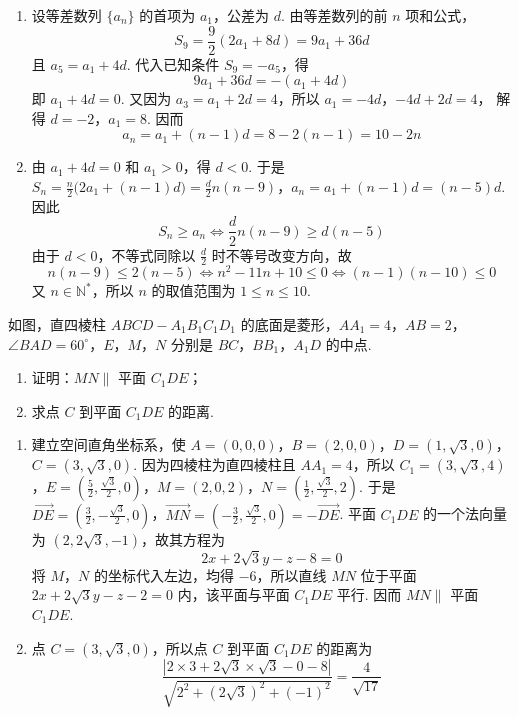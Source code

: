 \begin{solution}
\begin{enumerate}
\item 设等差数列 \(\{a_n\}\) 的首项为 \(a_1\)，公差为 \(d\). 由等差数列的前 \(n\) 项和公式，
\[
S_9=\frac{9}{2}(2a_1+8d)=9a_1+36d
\]
且 \(a_5=a_1+4d\). 代入已知条件 \(S_9=-a_5\)，得
\[
9a_1+36d=-(a_1+4d)
\]
即 \(a_1+4d=0\). 又因为 \(a_3=a_1+2d=4\)，所以
\(a_1=-4d\)，\(-4d+2d=4\)，
解得 \(d=-2\)，\(a_1=8\). 因而
\[
a_n=a_1+(n-1)d=8-2(n-1)=10-2n
\]

\item 由 \(a_1+4d=0\) 和 \(a_1>0\)，得 \(d<0\). 于是
\(S_n=\frac{n}{2}\bigl(2a_1+(n-1)d\bigr)=\frac{d}{2}n(n-9)\)，\(a_n=a_1+(n-1)d=(n-5)d\).
因此
\[
S_n\ge a_n
\iff \frac{d}{2}n(n-9)\ge d(n-5)
\]
由于 \(d<0\)，不等式同除以 \(\frac{d}{2}\) 时不等号改变方向，故
\[
n(n-9)\le2(n-5)
\iff n^2-11n+10\le0
\iff (n-1)(n-10)\le0
\]
又 \(n\in\mathbb N^*\)，所以 \(n\) 的取值范围为 \(1\le n\le10\).
\end{enumerate}
\end{solution}

\begin{problem}
如图，直四棱柱 \( ABCD-A_1B_1C_1D_1 \) 的底面是菱形，\( AA_1=4 \)，\( AB=2 \)，\( \angle BAD=60^\circ \)，\(E\)，\(M\)，\(N\) 分别是 \(BC\)，\(BB_1\)，\(A_1D\) 的中点.

\begin{enumerate}
\item 证明：\( MN\parallel \) 平面 \(C_1DE\)；
\item 求点 \(C\) 到平面 \(C_1DE\) 的距离.
\end{enumerate}

\end{problem}

\begin{solution}
\begin{enumerate}
\item 建立空间直角坐标系，使
\(A=(0,0,0)\)，\(B=(2,0,0)\)，\(D=(1,\sqrt3,0)\)，\(C=(3,\sqrt3,0)\).
因为四棱柱为直四棱柱且 \(AA_1=4\)，所以
\(C_1=(3,\sqrt3,4)\)，\(E=\left(\frac52,\frac{\sqrt3}{2},0\right)\)，\(M=(2,0,2)\)，\(N=\left(\frac12,\frac{\sqrt3}{2},2\right)\).
于是
\(\overrightarrow{DE}=\left(\frac32,-\frac{\sqrt3}{2},0\right)\)，\(\overrightarrow{MN}=\left(-\frac32,\frac{\sqrt3}{2},0\right)=-\overrightarrow{DE}\).
平面 \(C_1DE\) 的一个法向量为 \((2,2\sqrt3,-1)\)，故其方程为
\[
2x+2\sqrt3y-z-8=0
\]
将 \(M\)，\(N\) 的坐标代入左边，均得 \(-6\)，所以直线 \(MN\) 位于平面 \(2x+2\sqrt3y-z-2=0\) 内，该平面与平面 \(C_1DE\) 平行. 因而 \(MN\parallel\) 平面 \(C_1DE\).

\item 点 \(C=(3,\sqrt3,0)\)，所以点 \(C\) 到平面 \(C_1DE\) 的距离为
\[
\frac{|2\times3+2\sqrt3\times\sqrt3-0-8|}{\sqrt{2^2+(2\sqrt3)^2+(-1)^2}}
=\frac4{\sqrt{17}}
\]
\end{enumerate}
\end{solution}

